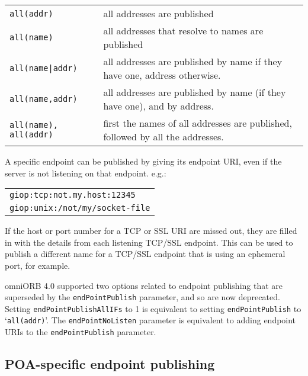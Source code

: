 \documentclass[11pt,oneside,a4paper]{book}
\newcommand{\code}[1]{\texttt{#1}}
\begin{document}
\vspace{\baselineskip}

\begin{tabular}{p{}p{}}
\code{all(addr)} & all addresses are published\\
\code{all(name)} & all addresses that resolve to names are published\\
\code{all(name|addr)} & all addresses are published by name if they have
                        one, address otherwise.\\
\code{all(name,addr)} & all addresses are published by name (if they
                        have one), and by address.\\
\code{all(name), all(addr)} & first the names of all addresses are published,
                             followed by all the addresses.\\
\end{tabular}

\vspace{\baselineskip}

\noindent
A specific endpoint can be published by giving its endpoint URI,
even if the server is not listening on that endpoint. e.g.:

\vspace{\baselineskip}

\begin{tabular}{p{}}
\code{giop:tcp:not.my.host:12345}\\
\code{giop:unix:/not/my/socket-file}\\
\end{tabular}

\vspace{\baselineskip}

\noindent
If the host or port number for a TCP or SSL URI are missed out,
they are filled in with the details from each listening TCP/SSL
endpoint. This can be used to publish a different name for a
TCP/SSL endpoint that is using an ephemeral port, for example.

omniORB 4.0 supported two options related to endpoint publishing that
are superseded by the \code{endPointPublish} parameter, and so are now
deprecated. Setting \code{endPointPublishAllIFs} to 1 is equivalent to
setting \code{endPointPublish} to `\code{all(addr)}'. The
\code{endPointNoListen} parameter is equivalent to adding endpoint
URIs to the \code{endPointPublish} parameter.


\subsection{POA-specific endpoint publishing}
\end{document}
